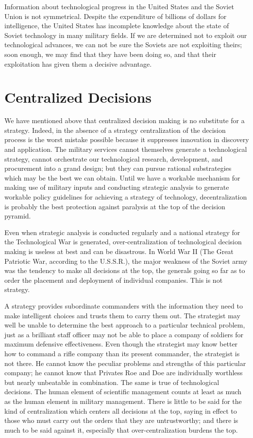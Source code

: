 Information about technological progress in the United States and the Soviet Union is not symmetrical. Despite the expenditure of billions of dollars for intelligence, the United States has incomplete knowledge about the state of Soviet technology in many military fields. If we are determined not to exploit our technological advances, we can not be sure the Soviets are not exploiting theirs; soon enough, we may find that they have been doing so, and that their exploitation has given them a decisive advantage.

\section{Centralized Decisions}
We have mentioned above that centralized decision making is no substitute for a strategy. Indeed, in the absence of a strategy centralization of the decision process is the worst mistake possible because it suppresses innovation in discovery and application. The military services cannot themselves generate a technological strategy, cannot orchestrate our technological research, development, and procurement into a grand design; but they can pursue rational substrategies which may be the best we can obtain. Until we have a workable mechanism for making use of military inputs and conducting strategic analysis to generate workable policy guidelines for achieving a strategy of technology, decentralization is probably the best protection against paralysis at the top of the decision pyramid.

Even when strategic analysis is conducted regularly and a national strategy for the Technological War is generated, over-centralization of technological decision making is useless at best and can be disastrous. In World War II (The Great Patriotic War, according to the U.S.S.R.), the major weakness of the Soviet army was the tendency to make all decisions at the top, the generals going so far as to order the placement and deployment of individual companies. This is not strategy.

A strategy provides subordinate commanders with the information they need to make intelligent choices and trusts them to carry them out. The strategist may well be unable to determine the best approach to a particular technical problem, just as a brilliant staff officer may not be able to place a company of soldiers for maximum defensive effectiveness. Even though the strategist may know better how to command a rifle company than its present commander, the strategist is not there. He cannot know the peculiar problems and strengths of this particular company; he cannot know that Privates Roe and Doe are individually worthless but nearly unbeatable in combination. The same is true of technological decisions. The human element of scientific management counts at least as much as the human element in military management. There is little to be said for the kind of centralization which centers all decisions at the top, saying in effect to those who must carry out the orders that they are untrustworthy; and there is much to be said against it, especially that over-centralization burdens the top.

